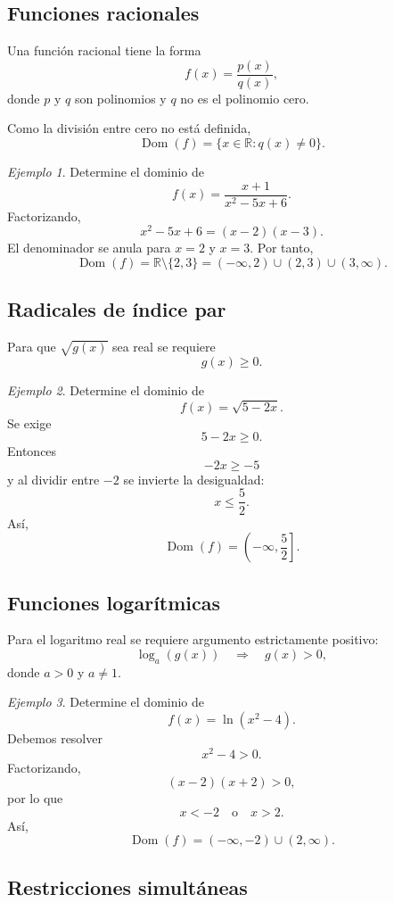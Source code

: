 \documentclass[12pt]{article}
\theoremstyle{remark}
\newtheorem{ejemplo}{Ejemplo}[section]
\newcommand{\R}{\mathbb{R}}
\newcommand{\Dom}{\operatorname{Dom}}
\begin{document}
\subsection{Funciones racionales}

Una función racional tiene la forma
\[
f(x)=\frac{p(x)}{q(x)},
\]
donde $p$ y $q$ son polinomios y $q$ no es el polinomio cero.

Como la división entre cero no está definida,
\[
\Dom(f)=\{x\in\R:q(x)\neq0\}.
\]

\begin{ejemplo}
Determine el dominio de
\[
f(x)=\frac{x+1}{x^2-5x+6}.
\]
Factorizando,
\[
x^2-5x+6=(x-2)(x-3).
\]
El denominador se anula para $x=2$ y $x=3$. Por tanto,
\[
\Dom(f)=\R\setminus\{2,3\}
=(-\infty,2)\cup(2,3)\cup(3,\infty).
\]
\end{ejemplo}

\subsection{Radicales de índice par}

Para que $\sqrt{g(x)}$ sea real se requiere
\[
g(x)\geq0.
\]

\begin{ejemplo}
Determine el dominio de
\[
f(x)=\sqrt{5-2x}.
\]
Se exige
\[
5-2x\geq0.
\]
Entonces
\[
-2x\geq-5
\]
y al dividir entre $-2$ se invierte la desigualdad:
\[
x\leq\frac52.
\]
Así,
\[
\Dom(f)=\left(-\infty,\frac52\right].
\]
\end{ejemplo}

\subsection{Funciones logarítmicas}

Para el logaritmo real se requiere argumento estrictamente positivo:
\[
\log_a(g(x))
\quad\Longrightarrow\quad
g(x)>0,
\]
donde $a>0$ y $a\neq1$.

\begin{ejemplo}
Determine el dominio de
\[
f(x)=\ln(x^2-4).
\]
Debemos resolver
\[
x^2-4>0.
\]
Factorizando,
\[
(x-2)(x+2)>0,
\]
por lo que
\[
x<-2\quad\text{o}\quad x>2.
\]
Así,
\[
\Dom(f)=(-\infty,-2)\cup(2,\infty).
\]
\end{ejemplo}

\subsection{Restricciones simultáneas}
\end{document}
